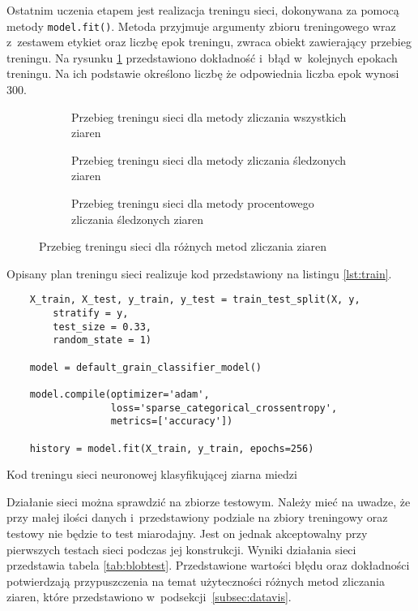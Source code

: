 Ostatnim uczenia etapem jest realizacja treningu sieci, dokonywana za pomocą
metody \texttt{model.fit()}.
Metoda przyjmuje argumenty zbioru treningowego wraz z~zestawem etykiet
oraz liczbę epok treningu, zwraca obiekt zawierający przebieg treningu.
Na rysunku \ref{fig:history} przedstawiono dokładność i~błąd w~kolejnych
epokach treningu.
Na ich podstawie określono liczbę że odpowiednia liczba epok wynosi 300.
\begin{figure}[htbp]
	\centering
	\begin{subfigure}[t]{0.3\textwidth}
		\centering
		
		\caption{Przebieg treningu sieci dla metody zliczania wszystkich
		         ziaren}
	\end{subfigure}
	\hfill
	\begin{subfigure}[t]{0.3\textwidth}
		\centering
		
		\caption{Przebieg treningu sieci dla metody zliczania śledzonych 
		         ziaren}
	\end{subfigure}
	\hfill
	\begin{subfigure}[t]{0.3\textwidth}
		\centering
		
		\caption{Przebieg treningu sieci dla metody procentowego zliczania
		         śledzonych ziaren}
	\end{subfigure}
	\caption{Przebieg treningu sieci dla różnych metod zliczania ziaren}
	\label{fig:history}
\end{figure}
Opisany plan treningu sieci realizuje kod przedstawiony na listingu
\ref{lst:train}.
\begin{listing}[htbp]
\begin{verbatim}
    X_train, X_test, y_train, y_test = train_test_split(X, y,
        stratify = y,
        test_size = 0.33,
        random_state = 1)

    model = default_grain_classifier_model()

    model.compile(optimizer='adam',
                  loss='sparse_categorical_crossentropy',
                  metrics=['accuracy'])
    
    history = model.fit(X_train, y_train, epochs=256)
\end{verbatim}
\caption{Kod treningu sieci neuronowej klasyfikującej ziarna miedzi}
\label{lst:train}
\end{listing}

Działanie sieci można sprawdzić na zbiorze testowym.
Należy mieć na uwadze, że przy małej ilości danych i~przedstawiony 
podziale na zbiory treningowy oraz testowy nie będzie to test miarodajny.
Jest on jednak akceptowalny przy pierwszych testach sieci podczas jej
konstrukcji.
Wyniki działania sieci przedstawia tabela \ref{tab:blobtest}.
Przedstawione wartości błędu oraz dokładności potwierdzają przypuszczenia
na temat użyteczności różnych metod zliczania ziaren, które przedstawiono
w~podsekcji~\ref{subsec:datavis}.

